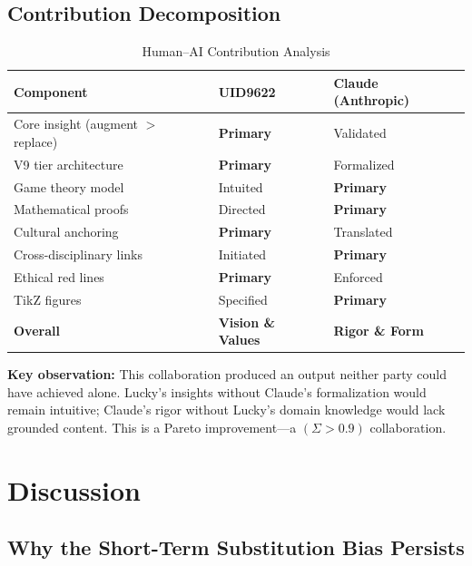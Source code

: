 \documentclass[conference]{IEEEtran}
\begin{document}
\subsection{Contribution Decomposition}

\begin{table}[!ht]
\caption{Human--AI Contribution Analysis}
\label{tab:contrib}
\centering
\renewcommand{\arraystretch}{1.15}
\begin{tabular}{p{2.3cm}p{2.0cm}p{2.9cm}}
\toprule
\textbf{Component}
  & \textbf{UID9622}
  & \textcolor{anthro}{\textbf{Claude (Anthropic)}} \\
\midrule
Core insight (augment $>$ replace)
  & \textbf{Primary} & Validated \\
V9 tier architecture
  & \textbf{Primary} & Formalized \\
Game theory model
  & Intuited & \textcolor{anthro}{\textbf{Primary}} \\
Mathematical proofs
  & Directed & \textcolor{anthro}{\textbf{Primary}} \\
Cultural anchoring
  & \textbf{Primary} & Translated \\
Cross-disciplinary links
  & Initiated & \textcolor{anthro}{\textbf{Primary}} \\
Ethical red lines
  & \textbf{Primary} & Enforced \\
TikZ figures
  & Specified & \textcolor{anthro}{\textbf{Primary}} \\
\midrule
\textbf{Overall}
  & \textbf{Vision \& Values}
  & \textcolor{anthro}{\textbf{Rigor \& Form}} \\
\bottomrule
\end{tabular}
\end{table}

\textbf{Key observation:}
This collaboration produced an output neither party
could have achieved alone. Lucky's insights without
Claude's formalization would remain intuitive;
Claude's rigor without Lucky's domain knowledge
would lack grounded content.
This is a Pareto improvement---a $(\Sigma > 0.9)$
collaboration.

\section{Discussion}

\subsection{Why the Short-Term Substitution Bias Persists}
\end{document}
